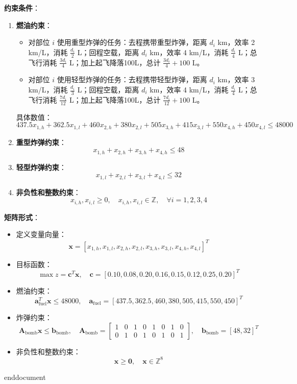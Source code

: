 \textbf{约束条件}：
\begin{enumerate}
    \item \textbf{燃油约束}：
        \begin{itemize}
            \item 对部位 \( i \) 使用重型炸弹的任务：去程携带重型炸弹，距离 \( d_i \) km，效率 2 km/L，消耗 \( \frac{d_i}{2} \) L；回程空载，距离 \( d_i \) km，效率 4 km/L，消耗 \( \frac{d_i}{4} \) L；总飞行消耗 \( \frac{3 d_i}{4} \) L；加上起飞降落100L，总计 \( \frac{3 d_i}{4} + 100 \) L。
            \item 对部位 \( i \) 使用轻型炸弹的任务：去程携带轻型炸弹，距离 \( d_i \) km，效率 3 km/L，消耗 \( \frac{d_i}{3} \) L；回程空载，距离 \( d_i \) km，效率 4 km/L，消耗 \( \frac{d_i}{4} \) L；总飞行消耗 \( \frac{7 d_i}{12} \) L；加上起飞降落100L，总计 \( \frac{7 d_i}{12} + 100 \) L。
        \end{itemize}
        具体数值：
        \[
        437.5 x_{1,h} + 362.5 x_{1,l} + 460 x_{2,h} + 380 x_{2,l} + 505 x_{3,h} + 415 x_{3,l} + 550 x_{4,h} + 450 x_{4,l} \leq 48000
        \]
    \item \textbf{重型炸弹约束}：
        \[
        x_{1,h} + x_{2,h} + x_{3,h} + x_{4,h} \leq 48
        \]
    \item \textbf{轻型炸弹约束}：
        \[
        x_{1,l} + x_{2,l} + x_{3,l} + x_{4,l} \leq 32
        \]
    \item \textbf{非负性和整数约束}：
        \[
        x_{i,h}, x_{i,l} \geq 0, \quad x_{i,h}, x_{i,l} \in \mathbb{Z}, \quad \forall i=1,2,3,4
        \]
\end{enumerate}

\textbf{矩阵形式}：
\begin{itemize}
    \item 定义变量向量：
    \[
    \mathbf{x} = [x_{1,h}, x_{1,l}, x_{2,h}, x_{2,l}, x_{3,h}, x_{3,l}, x_{4,h}, x_{4,l}]^T
    \]
    \item 目标函数：
    \[
    \max z = \mathbf{c}^T \mathbf{x}, \quad \mathbf{c} = [0.10, 0.08, 0.20, 0.16, 0.15, 0.12, 0.25, 0.20]^T
    \]
    \item 燃油约束：
    \[
    \mathbf{a}_{\text{fuel}}^T \mathbf{x} \leq 48000, \quad \mathbf{a}_{\text{fuel}} = [437.5, 362.5, 460, 380, 505, 415, 550, 450]^T
    \]
    \item 炸弹约束：
    \[
    \mathbf{A}_{\text{bomb}} \mathbf{x} \leq \mathbf{b}_{\text{bomb}}, \quad \mathbf{A}_{\text{bomb}} = \begin{bmatrix}
    1 & 0 & 1 & 0 & 1 & 0 & 1 & 0 \\
    0 & 1 & 0 & 1 & 0 & 1 & 0 & 1
    \end{bmatrix}, \quad \mathbf{b}_{\text{bomb}} = [48, 32]^T
    \]
    \item 非负性和整数约束：
    \[
    \mathbf{x} \geq \mathbf{0}, \quad \mathbf{x} \in \mathbb{Z}^8
    \]
\end{itemize}


\ifx\allfiles\undefined
	
	
	
	end{document}
	\else
	\fi